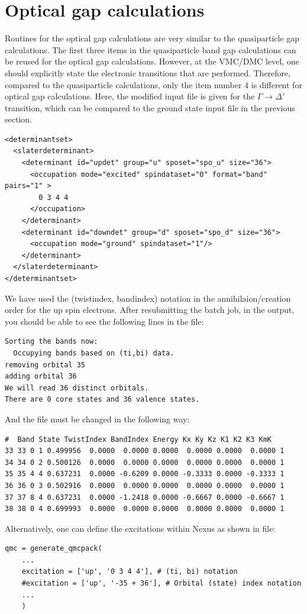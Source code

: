 \section{Optical gap calculations}
Routines for the optical gap calculations are very similar to the quasiparticle gap calculations. 
The first three items in the quasiparticle band gap calculations can be reused for the optical gap calculations. 
However, at the VMC/DMC level, one should explicitly state the electronic transitions that are performed. 
Therefore, compared to the quasiparticle calculations, only the item number 4 is different for optical gap calculations. 
Here, the modified input file is given for the $\Gamma\rightarrow\Delta'$ transition, which can be compared to the ground state input file in the previous section. 
\begin{lstlisting}[style=QMCPXML]
<determinantset>
  <slaterdeterminant>
    <determinant id="updet" group="u" sposet="spo_u" size="36">
      <occupation mode="excited" spindataset="0" format="band" pairs="1" >
        0 3 4 4
      </occupation>
    </determinant>
    <determinant id="downdet" group="d" sposet="spo_d" size="36">
      <occupation mode="ground" spindataset="1"/>	
    </determinant>
  </slaterdeterminant>
</determinantset>
\end{lstlisting}
We have used the (twistindex, bandindex) notation in the annihilaion/creation order for the up spin electrons.
After resubmitting the batch job, in the output, you should be able to see the following lines in the  file:
\begin{lstlisting}[style=SHELL]
Sorting the bands now:
  Occupying bands based on (ti,bi) data.
removing orbital 35
adding orbital 36
We will read 36 distinct orbitals.
There are 0 core states and 36 valence states.
\end{lstlisting}
And the  file must be changed in the following way: 
\begin{lstlisting}[style=SHELL]
#  Band State TwistIndex BandIndex Energy Kx Ky Kz K1 K2 K3 KmK
33 33 0	1 0.499956	0.0000  0.0000 0.0000  0.0000 0.0000  0.0000 1
34 34 0	2 0.500126	0.0000  0.0000 0.0000  0.0000 0.0000  0.0000 1
35 35 4	4 0.637231	0.0000 -0.6209 0.0000 -0.3333 0.0000 -0.3333 1
36 36 0	3 0.502916	0.0000  0.0000 0.0000  0.0000 0.0000  0.0000 1
37 37 8	4 0.637231	0.0000 -1.2418 0.0000 -0.6667 0.0000 -0.6667 1
38 38 0	4 0.699993	0.0000  0.0000 0.0000  0.0000 0.0000  0.0000 1
\end{lstlisting}
Alternatively, one can define the excitations within Nexus as shown in  file:
\begin{lstlisting}[style=Python]
qmc = generate_qmcpack(
    ...
    excitation = ['up', '0 3 4 4'], # (ti, bi) notation
    #excitation = ['up', '-35 + 36'], # Orbital (state) index notation
    ...
    )
\end{lstlisting}

